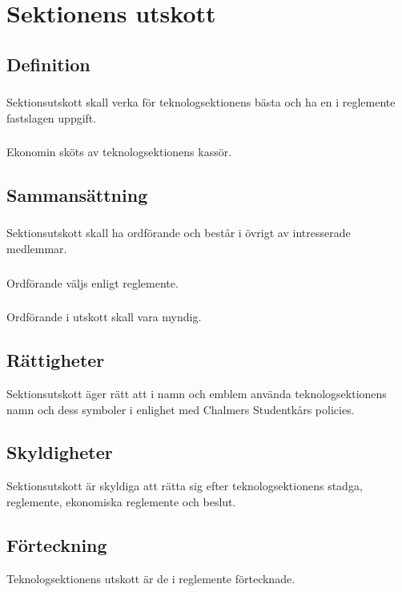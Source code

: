 \section{Sektionens utskott}

\subsection{Definition}

\subsubsection{}
Sektionsutskott skall verka för teknologsektionens bästa och ha en i
reglemente fastslagen uppgift.

\subsubsection{}
Ekonomin sköts av teknologsektionens kassör.

\subsection{Sammansättning}

\subsubsection{}
Sektionsutskott skall ha ordförande och består i övrigt av
intresserade medlemmar.

\subsubsection{}
Ordförande väljs enligt reglemente.

\subsubsection{}
Ordförande i utskott skall vara myndig.

\subsection{Rättigheter}

Sektionsutskott äger rätt att i namn och emblem använda
teknologsektionens namn och dess symboler i enlighet med Chalmers
Studentkårs policies.

\subsection{Skyldigheter}

Sektionsutskott är skyldiga att rätta sig efter teknologsektionens stadga,
reglemente, ekonomiska reglemente och beslut.

\subsection{Förteckning}

Teknologsektionens utskott är de i reglemente förtecknade.
